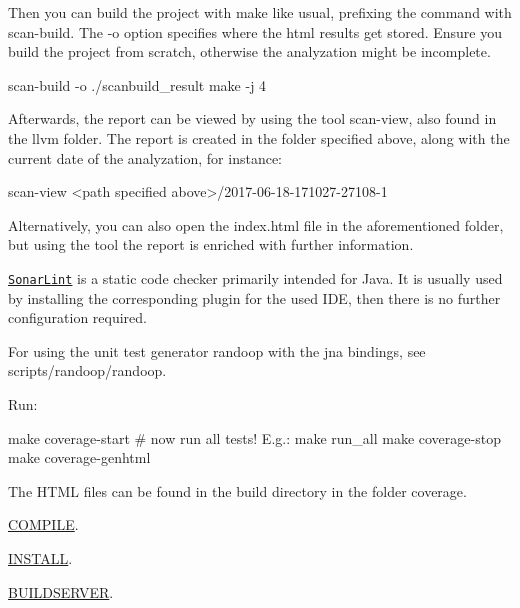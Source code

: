 Then you can build the project with {\ttfamily make} like usual, prefixing the command with {\ttfamily scan-\/build}. The {\ttfamily -\/o} option specifies where the html results get stored. Ensure you build the project from scratch, otherwise the analyzation might be incomplete.


\begin{DoxyCode}
scan-build -o ./scanbuild\_result make -j 4
\end{DoxyCode}


Afterwards, the report can be viewed by using the tool {\ttfamily scan-\/view}, also found in the llvm folder. The report is created in the folder specified above, along with the current date of the analyzation, for instance\+:


\begin{DoxyCode}
scan-view <path specified above>/2017-06-18-171027-27108-1
\end{DoxyCode}


Alternatively, you can also open the {\ttfamily index.\+html} file in the aforementioned folder, but using the tool the report is enriched with further information.

\href{http://www.sonarlint.org/}{\tt Sonar\+Lint} is a static code checker primarily intended for Java. It is usually used by installing the corresponding plugin for the used I\+DE, then there is no further configuration required.

For using the unit test generator randoop with the jna bindings, see {\ttfamily scripts/randoop/randoop}.

Run\+:


\begin{DoxyCode}
make coverage-start
# now run all tests! E.g.:
make run\_all
make coverage-stop
make coverage-genhtml
\end{DoxyCode}


The H\+T\+ML files can be found in the build directory in the folder {\ttfamily coverage}.


\begin{DoxyItemize}
\item \hyperlink{doc_COMPILE_md}{C\+O\+M\+P\+I\+LE}.
\item \hyperlink{doc_INSTALL_md}{I\+N\+S\+T\+A\+LL}.
\item \hyperlink{doc_BUILDSERVER_md}{B\+U\+I\+L\+D\+S\+E\+R\+V\+ER}. 
\end{DoxyItemize}